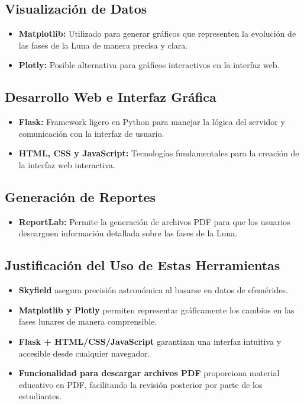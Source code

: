 \subsection*{Visualización de Datos}
\begin{itemize}
    \item \textbf{Matplotlib:} Utilizado para generar gráficos que representen la evolución de las fases de la Luna de manera precisa y clara.
    \item \textbf{Plotly:} Posible alternativa para gráficos interactivos en la interfaz web.
\end{itemize}

\subsection*{Desarrollo Web e Interfaz Gráfica}
\begin{itemize}
    \item \textbf{Flask:} Framework ligero en Python para manejar la lógica del servidor y comunicación con la interfaz de usuario.
    \item \textbf{HTML, CSS y JavaScript:} Tecnologías fundamentales para la creación de la interfaz web interactiva.
\end{itemize}

\subsection*{Generación de Reportes}
\begin{itemize}
    \item \textbf{ReportLab:} Permite la generación de archivos PDF para que los usuarios descarguen información detallada sobre las fases de la Luna.
\end{itemize}

\subsection*{Justificación del Uso de Estas Herramientas}
\begin{itemize}
    \item \textbf{Skyfield} asegura precisión astronómica al basarse en datos de efemérides.
    \item \textbf{Matplotlib y Plotly} permiten representar gráficamente los cambios en las fases lunares de manera comprensible.
    \item \textbf{Flask + HTML/CSS/JavaScript} garantizan una interfaz intuitiva y accesible desde cualquier navegador.
    \item \textbf{Funcionalidad para descargar archivos PDF} proporciona material educativo en PDF, facilitando la revisión posterior por parte de los estudiantes.
\end{itemize}

